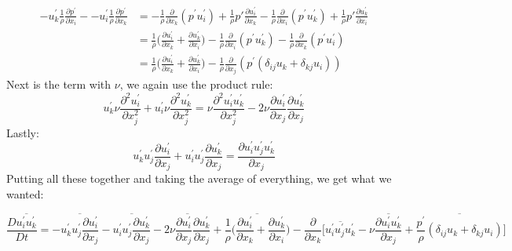 \documentclass[a4paper,norsk]{article}
\begin{document}
\begin{align*}
- u_k^{'}\frac{1}{\rho}\frac{\partial p^{'}} {\partial x_i} - - u_i^{'}\frac{1}{\rho}\frac{\partial p^{'}} {\partial x_k} &=  -\frac{1}{\rho}\frac{\partial}{\partial x_k} (p^{'} u_i^{'}) +  \frac{1}{\rho}p{'} \frac{\partial u_i^{'} }{\partial x_k} - \frac{1}{\rho}\frac{\partial}{\partial x_i} (p^{'} u_k^{'}) + \frac{1}{\rho}p{'} \frac{\partial u_k^{'} }{\partial x_i} \\
 & =\frac{1}{\rho}\big( \frac{\partial u^{'}_i}{\partial x_k} + \frac{\partial u^{'}_k}{\partial x_i} \big) - \frac{1}{\rho}\frac{\partial}{\partial x_i} (p^{'} u_k^{'}) - \frac{1}{\rho}\frac{\partial}{\partial x_k} (p^{'} u_i^{'}) \\
 &=  \frac{1}{\rho}\big( \frac{\partial u^{'}_i}{\partial x_k} + \frac{\partial u^{'}_k}{\partial x_i} \big) -\frac{1}{\rho} \frac{\partial}{\partial x_j} ( p^{'}( \delta_{ij} u_k + \delta_{kj}u_i    )     )
\end{align*}
Next is the term with $\nu$, we again use the product rule:
\begin{equation*}
u_k^{'}\nu \frac{\partial^2 u^{'}_i} {\partial x_j^2} + u_i^{'}\nu \frac{\partial^2 u^{'}_k} {\partial x_j^2} = \nu \frac{\partial^2 u^{'}_i u^{'}_k}{\partial x_j^2} - 2\nu \frac{\partial u^{'}_i }{\partial x_j} \frac{\partial u^{'}_k }{\partial x_j}
\end{equation*}
Lastly:
\begin{equation*}
u_k^{'}u_j^{'}\frac{\partial u_i^{'}}{\partial x_j} + u_i^{'}u_j^{'}\frac{\partial u_k^{'}}{\partial x_j} = \frac{\partial u_i^{'} u_j^{'} u_k^{'}}{\partial x_j}
\end{equation*}
Putting all these together and taking the average of everything, we get what we wanted:

\begin{equation}
 \frac{D \overline{u_i^{'}u_k^{'}}}{Dt} = -\overline{ u_k^{'}u_j^{'}\frac{\partial u_i^{'}}{\partial x_j}} - \overline{u_i^{'}u_j^{'}\frac{\partial u_k^{'}}{\partial x_j}} -  \overline{2\nu \frac{\partial u^{'}_i }{\partial x_j} \frac{\partial u^{'}_k }{\partial x_j}}
 + \overline{\frac{1}{\rho}\big( \frac{\partial u^{'}_i}{\partial x_k} + \frac{\partial u^{'}_k}{\partial x_i} \big)} - \frac{\partial }{\partial x_k} \big[ \overline{u_i^{'} u_j^{'} u_k^{'}} -  \nu\overline{ \frac{\partial u^{'}_i u^{'}_k}{\partial x_j}} + 
     \overline{\frac{p^{'}}{\rho} ( \delta_{ij} u_k + \delta_{kj}u_i  )} \big]  
\end{equation}
\end{document}
